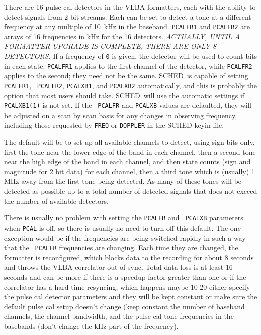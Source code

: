 \documentclass{report}
\newcommand{\schedb}{{\sc SCHED~}}
\begin{document}
There are 16 pulse cal detectors in the VLBA formatters, each with the
ability to detect signals from 2 bit streams. Each can be set to
detect a tone at a different frequency at any multiple of 10~kHz in
the baseband. {\tt PCALFR1} and {\tt PCALFR2} are arrays of 16
frequencies in kHz for the 16 detectors. {\em ACTUALLY, UNTIL A
FORMATTER UPGRADE IS COMPLETE, THERE ARE ONLY 8 DETECTORS.} If a
frequency of {\tt 0} is given, the detector will be used to count bits
in each state. {\tt PCALFR1} applies to the first channel of the
detector, while {\tt PCALFR2} applies to the second; they need not be
the same. \schedb is capable of setting {\tt PCALFR1}, {\tt
PCALFR2}, {\tt PCALXB1}, and {\tt PCALXB2} automatically, and this is
probably the option that most users should take. \schedb will use
the automatic settings if {\tt PCALXB1(1)} is not set.  If the {\tt
PCALFR} and {\tt PCALXB} values are defaulted, they will be adjusted
on a scan by scan basis for any changes in observing frequency,
including those requested by {\tt FREQ} or {\tt DOPPLER} in the {\sc
SCHED} keyin file.

The default will be to set up all available channels to detect, using
sign bits only, first the tone near the lower edge of the band in each
channel, then a second tone near the high edge of the band in each
channel, and then state counts (sign and magnitude for 2 bit data) for
each channel, then a third tone which is (usually) 1 MHz away from the
first tone being detected.  As many of these tones will be detected as
possible up to a total number of detected signals that does not exceed
the number of available detectors.

There is usually no problem with setting the {\tt PCALFR} and {\tt
PCALXB} parameters when {\tt PCAL} is off, so there is usually no need
to turn off this default. The one exception would be if the
frequencies are being switched rapidly in such a way that the {\tt
PCALFR} frequencies are changing. Each time they are changed, the
formatter is reconfigured, which blocks data to the recording for
about 8 seconds and throws the VLBA correlator out of sync.  Total
data loss is at least 16 seconds and can be more if there is a speedup
factor greater than one or if the correlator has a hard time
resyncing, which happens maybe 10-20%
either specify the pulse cal detector parameters and they will be kept
constant or make sure the default pulse cal setup doesn't change (keep
constant the number of baseband channels, the channel bandwidth, and
the pulse cal tone frequencies in the basebands (don't change the kHz
part of the frequency).
\end{document}
